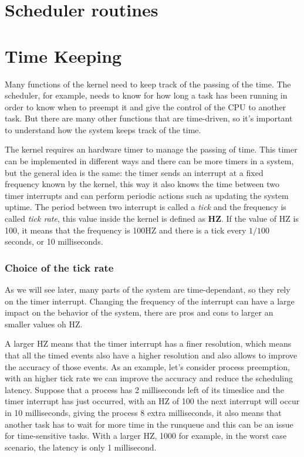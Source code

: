\documentclass[10pt]{book}
\begin{document}
\section{Scheduler routines} 

\section{Time Keeping}%
\label{timekeeping}
Many functions of the kernel need to keep track of the passing of the time. The scheduler, for example, needs to know for how long a task has been running in order to know when to preempt it and give the control of the CPU to another task. But there are many other functions that are time-driven, so it's important to understand how the system keeps track of the time.

The kernel requires an hardware timer to manage the passing of time. This timer can be implemented in different ways and there can be more timers in a system, but the general idea is the same: the timer sends an interrupt at a fixed frequency known by the kernel, this way it also knows the time between two timer interrupts and can perform periodic actions such as updating the system uptime. The period between two interrupt is called a \textit{tick} and the frequency is called \textit{tick rate}, this value inside the kernel is defined as \textbf{HZ}. If the value of HZ is 100, it means that the frequency is 100HZ and there is a tick every $1/100$ seconds, or 10 milliseconds.

\subsubsection{Choice of the tick rate}
As we will see later, many parts of the system are time-dependant, so they rely on the timer interrupt. Changing the frequency of the interrupt can have a large impact on the behavior of the system, there are pros and cons to larger an smaller values oh HZ.

A larger HZ means that the timer interrupt has a finer resolution, which means that all the timed events also have a higher resolution and also allows to improve the accuracy of those events. As an example, let's consider process preemption, with an higher tick rate we can improve the accuracy and reduce the scheduling latency. Suppose that a process has 2 milliseconds left of its timeslice and the timer interrupt has just occurred, with an HZ of 100 the next interrupt will occur in 10 milliseconds, giving the process 8 extra milliseconds, it also means that another task has to wait for more time in the runqueue and this can be an issue for time-sensitive tasks. With a larger HZ, 1000 for example, in the worst case scenario, the latency is only 1 millisecond.
\end{document}
